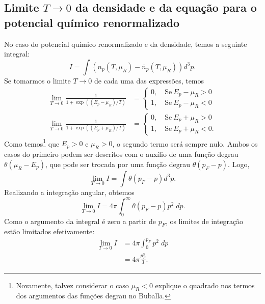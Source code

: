 \subsection{Limite $T \to 0$ da densidade e da equação para o potencial químico renormalizado}

No caso do potencial químico renormalizado e da densidade, temos a seguinte integral:
\begin{equation}
	I = \int (n_p(T,\mu_R) - \bar{n}_p(T, \mu_R)) d^3p.
\end{equation}
%
Se tomarmos o limite $T \to 0$ de cada uma das expressões, temos
\begin{align}
	\lim_{T \to 0} \frac{1}{1+\exp((E_p - \mu_R)/T)} &= \begin{cases} 0, \quad \textrm{Se}~E_p - \mu_R > 0 \\ 1, \quad \textrm{Se}~E_p - \mu_R < 0 \end{cases} \\
	\lim_{T \to 0} \frac{1}{1+\exp((E_p + \mu_R)/T)} &= \begin{cases} 0, \quad \textrm{Se}~E_p + \mu_R > 0 \\ 1, \quad \textrm{Se}~E_p + \mu_R < 0. \end{cases}
\end{align}
%
Como temos\footnote{Novamente, talvez considerar o caso $\mu_R < 0$ explique o quadrado nos termos dos argumentos das funções degrau no Buballa.} que $E_p > 0$ e $\mu_R > 0$, o segundo termo será sempre nulo. Ambos os casos do primeiro podem ser descritos com o auxílio de uma função degrau $\theta(\mu_R - E_p)$, que pode ser trocada por uma função degrau $\theta(p_F - p)$. Logo,
\begin{equation}
	\lim_{T \to 0} I = \int \theta(p_F - p)d^3p.
\end{equation}
%
Realizando a integração angular, obtemos
\begin{equation}
	\lim_{T \to 0} I = 4\pi \int_0^\infty \theta(p_F - p) p^2 \;dp.
\end{equation}
%
Como o argumento da integral é zero a partir de $p_F$, os limites de integração estão limitados efetivamente:
\begin{align}
	\lim_{T \to 0} I &= 4\pi \int_0^{p_F} p^2 \;dp \\
	&= 4\pi \frac{p_F^3}{3}.
\end{align}

